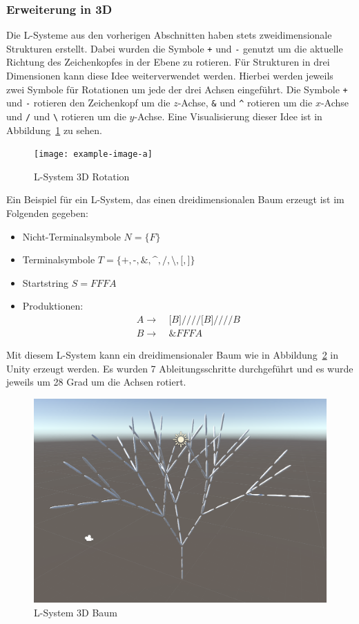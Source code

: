 \subsubsection{Erweiterung in 3D}
Die L-Systeme aus den vorherigen Abschnitten haben stets zweidimensionale Strukturen erstellt.
Dabei wurden die Symbole \texttt{+} und \texttt{-} genutzt um die aktuelle Richtung des Zeichenkopfes in der Ebene zu rotieren.
Für Strukturen in drei Dimensionen kann diese Idee weiterverwendet werden.
Hierbei werden jeweils zwei Symbole für Rotationen um jede der drei Achsen eingeführt.
Die Symbole \texttt{+} und \texttt{-} rotieren den Zeichenkopf um die $z$-Achse, \texttt{\&} und \texttt{\textasciicircum} rotieren um die $x$-Achse und \texttt{/} und \texttt{\textbackslash} rotieren um die $y$-Achse.
Eine Visualisierung dieser Idee ist in Abbildung~\ref{fig:L-System 3D Rotation} zu sehen.
\begin{figure}[ht]
    \centering
        
    \texttt{[image: example-image-a]}
    \caption{L-System 3D Rotation}\label{fig:L-System 3D Rotation}
\end{figure}

Ein Beispiel für ein L-System, das einen dreidimensionalen Baum erzeugt ist im Folgenden gegeben:
\begin{itemize}
    \item Nicht-Terminalsymbole $N=\{F\}$
    \item Terminalsymbole $T=\{\texttt{+},\texttt{-},\texttt{\&},\texttt{\textasciicircum},\texttt{/},\texttt{\textbackslash},\texttt{[},\texttt{]}\}$
    \item Startstring $S=FFFA$
    \item Produktionen:
    \begin{align*}
        A\rightarrow &~\texttt{[}B\texttt{]////[}B\texttt{]////}B \\
        B\rightarrow &~\texttt{\&}FFFA
    \end{align*}
\end{itemize}

Mit diesem L-System kann ein dreidimensionaler Baum wie in Abbildung~\ref{fig:L-System 3D Unity} in Unity erzeugt werden.
Es wurden 7 Ableitungsschritte durchgeführt und es wurde jeweils um 28 Grad um die Achsen rotiert.
\begin{figure}[ht]
    \centering
        
    \includegraphics[width=0.5\linewidth]{chapters/02_Grundlagen/L_System/L_System_3D_Tree.png}
    \caption{L-System 3D Baum}\label{fig:L-System 3D Unity}
\end{figure}


